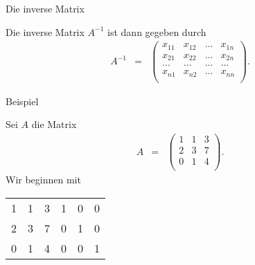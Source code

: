 \documentclass[german]{beamer}
\newcommand{\bq}{\begin{eqnarray*}}
\newcommand{\eq}{\end{eqnarray*}}
\begin{document}
\begin{frame}{Die inverse Matrix}

Die inverse Matrix $A^{-1}$ ist dann gegeben durch
\bq
A^{-1} & = &
\left( \begin{array}{cccc}
 x_{11} & x_{12} & ... & x_{1n} \\
 x_{21} & x_{22} & ... & x_{2n} \\
 ...    & ...    & ... & ...    \\
 x_{n1} & x_{n2} & ... & x_{nn} \\
\end{array} \right).
\eq

\end{frame}

\begin{frame}{Beispiel}

Sei $A$ die Matrix
\bq
 A & = &
\left( \begin{array}{ccc}
 1 &  1 &  3 \\
 2 &  3 &  7 \\
 0 &  1 &  4 \\
\end{array} \right).
\eq
Wir beginnen mit
\begin{center}
\begin{tabular}{rrr|rrr}
 1 &  1 &  3 & 1 & 0 & 0 \\
 2 &  3 &  7 & 0 & 1 & 0 \\
 0 &  1 &  4 & 0 & 0 & 1 \\
\end{tabular}
\end{center}


\end{frame}
\end{document}

